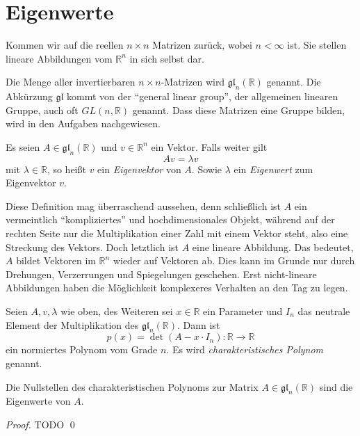 


\chapter{Eigenwerte}

Kommen wir auf die reellen $n\times n$ Matrizen zurück, wobei $n<\infty$ ist. Sie stellen lineare Abbildungen vom $\mathbb{R}^n$ in sich selbst dar. 
\begin{definition}
Die Menge aller invertierbaren $n\times n$-Matrizen wird $\mathfrak{gl}_n(\mathbb{R})$ genannt. Die Abkürzung $\mathfrak{gl}$ kommt von der "`general linear group"', der allgemeinen linearen Gruppe, auch oft $GL(n,\mathbb{R})$ genannt. Dass diese Matrizen eine Gruppe bilden, wird in den Aufgaben nachgewiesen.
\end{definition}


\begin{definition}
Es seien $A\in \mathfrak{gl}_n(\mathbb{R})$ und $v\in \mathbb{R}^n$ ein Vektor. Falls weiter gilt
\[
Av = \lambda v
\]
mit $\lambda\in \mathbb{R}$, so heißt $v$ ein \textsl{Eigenvektor} von $A$. Sowie $\lambda$ ein \textsl{Eigenwert} zum Eigenvektor $v$.
\end{definition}

Diese Definition mag überraschend aussehen, denn schließlich ist $A$ ein vermeintlich "`kompliziertes"' und hochdimensionales Objekt, während auf der rechten Seite nur die Multiplikation einer Zahl mit einem Vektor steht, also eine Streckung des Vektors. Doch letztlich ist $A$ eine lineare Abbildung. Das bedeutet, $A$ bildet Vektoren im $\mathbb{R}^n$ wieder auf Vektoren ab. Dies kann im Grunde nur durch Drehungen, Verzerrungen und Spiegelungen geschehen. Erst nicht-lineare Abbildungen haben die Möglichkeit komplexeres Verhalten an den Tag zu legen. 

\begin{definition}
Seien $A,v,\lambda$ wie oben, des Weiteren sei $x\in \mathbb{R}$ ein Parameter und $I_n$ das neutrale Element der Multiplikation des $\mathfrak{gl}_n(\mathbb{R})$. Dann ist 
\[
p(x) = \det(A-x\cdot I_n) : \mathbb{R} \longrightarrow \mathbb{R}
\]
ein normiertes Polynom vom Grade $n$. Es wird \textsl{charakteristisches Polynom} genannt.
\end{definition}

\begin{theorem}
Die Nullstellen des charakteristischen Polynoms zur Matrix $A\in \mathfrak{gl}_n(\mathbb{R})$ sind die Eigenwerte von $A$.
\end{theorem}
\begin{proof}
TODO
\qed
\end{proof}
